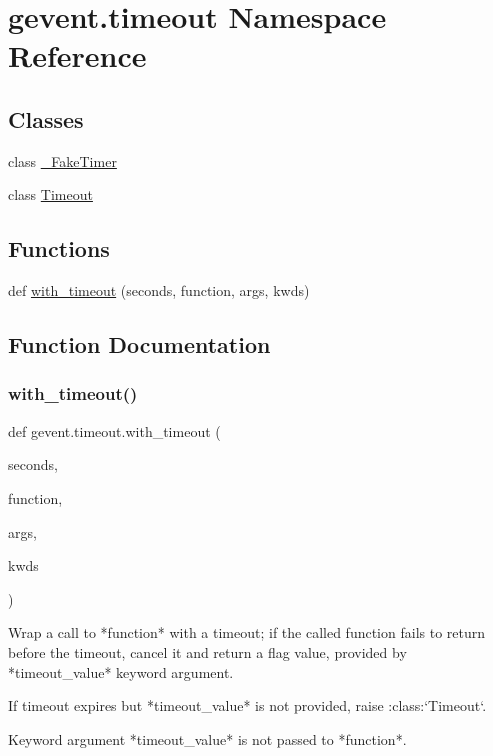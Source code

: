 \hypertarget{namespacegevent_1_1timeout}{}\section{gevent.\+timeout Namespace Reference}
\label{namespacegevent_1_1timeout}
\subsection*{Classes}
\begin{DoxyCompactItemize}
\item 
class \hyperlink{classgevent_1_1timeout_1_1___fake_timer}{\+\_\+\+Fake\+Timer}
\item 
class \hyperlink{classgevent_1_1timeout_1_1_timeout}{Timeout}
\end{DoxyCompactItemize}
\subsection*{Functions}
\begin{DoxyCompactItemize}
\item 
def \hyperlink{namespacegevent_1_1timeout_af92a9827ec17aabcc094324c96524aa5}{with\+\_\+timeout} (seconds, function, args, kwds)
\end{DoxyCompactItemize}


\subsection{Function Documentation}
\mbox{\label{namespacegevent_1_1timeout_af92a9827ec17aabcc094324c96524aa5}} 
\subsubsection{\texorpdfstring{with\+\_\+timeout()}{with\_timeout()}}
{\footnotesize\ttfamily def gevent.\+timeout.\+with\+\_\+timeout (\begin{DoxyParamCaption}\item[{}]{seconds,  }\item[{}]{function,  }\item[{}]{args,  }\item[{}]{kwds }\end{DoxyParamCaption})}

\begin{DoxyVerb}Wrap a call to *function* with a timeout; if the called
function fails to return before the timeout, cancel it and return a
flag value, provided by *timeout_value* keyword argument.

If timeout expires but *timeout_value* is not provided, raise :class:`Timeout`.

Keyword argument *timeout_value* is not passed to *function*.
\end{DoxyVerb}
 